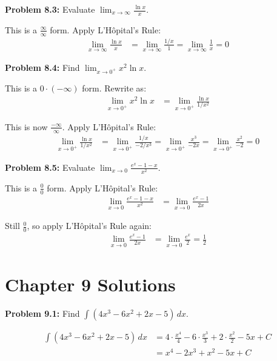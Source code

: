 \documentclass[12pt,a4paper]{book}
\theoremstyle{definition}
\begin{document}
\begin{solution}
\textbf{Problem 8.3:} Evaluate $\lim_{x \to \infty} \frac{\ln x}{x}$.

This is a $\frac{\infty}{\infty}$ form. Apply L'Hôpital's Rule:
\begin{align}
\lim_{x \to \infty} \frac{\ln x}{x} &= \lim_{x \to \infty} \frac{1/x}{1} = \lim_{x \to \infty} \frac{1}{x} = 0
\end{align}
\end{solution}

\begin{solution}
\textbf{Problem 8.4:} Find $\lim_{x \to 0^+} x^2 \ln x$.

This is a $0 \cdot (-\infty)$ form. Rewrite as:
\begin{align}
\lim_{x \to 0^+} x^2 \ln x &= \lim_{x \to 0^+} \frac{\ln x}{1/x^2}
\end{align}

This is now $\frac{-\infty}{\infty}$. Apply L'Hôpital's Rule:
\begin{align}
\lim_{x \to 0^+} \frac{\ln x}{1/x^2} &= \lim_{x \to 0^+} \frac{1/x}{-2/x^3} = \lim_{x \to 0^+} \frac{x^3}{-2x} = \lim_{x \to 0^+} \frac{x^2}{-2} = 0
\end{align}
\end{solution}

\begin{solution}
\textbf{Problem 8.5:} Evaluate $\lim_{x \to 0} \frac{e^x - 1 - x}{x^2}$.

This is a $\frac{0}{0}$ form. Apply L'Hôpital's Rule:
\begin{align}
\lim_{x \to 0} \frac{e^x - 1 - x}{x^2} &= \lim_{x \to 0} \frac{e^x - 1}{2x}
\end{align}

Still $\frac{0}{0}$, so apply L'Hôpital's Rule again:
\begin{align}
\lim_{x \to 0} \frac{e^x - 1}{2x} &= \lim_{x \to 0} \frac{e^x}{2} = \frac{1}{2}
\end{align}
\end{solution}

\section*{Chapter 9 Solutions}

\begin{solution}
\textbf{Problem 9.1:} Find $\int (4x^3 - 6x^2 + 2x - 5) \, dx$.

\begin{align}
\int (4x^3 - 6x^2 + 2x - 5) \, dx &= 4 \cdot \frac{x^4}{4} - 6 \cdot \frac{x^3}{3} + 2 \cdot \frac{x^2}{2} - 5x + C\\
&= x^4 - 2x^3 + x^2 - 5x + C
\end{align}
\end{solution}
\end{document}
